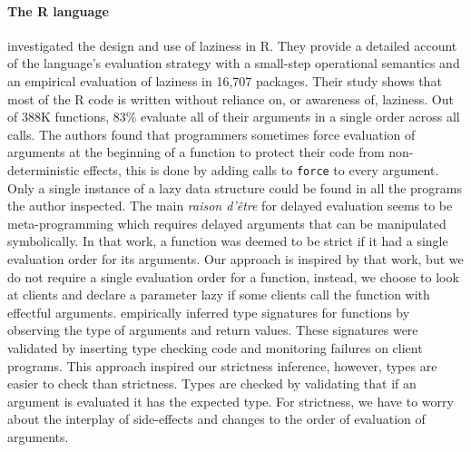 \documentclass[review,creen,acmsmall]{acmart}
\renewcommand{\c}[1]{\lstinline |#1|\xspace}
\begin{document}
\paragraph{The R language} \citet{oopsla19b} investigated the design and use of
laziness in R. They provide a detailed account of the language's evaluation
strategy with a small-step operational semantics and an empirical evaluation of
laziness in 16,707 packages. Their study shows that most of the R code is
written without reliance on, or awareness of, laziness. Out of 388K functions,
83\% evaluate all of their arguments in a single order across all calls. The
authors found that programmers sometimes force evaluation of arguments at the
beginning of a function to protect their code from non-deterministic effects,
this is done by adding calls to \c{force} to every argument. Only a single
instance of a lazy data structure could be found in all the programs the author
inspected. The main \emph{raison d'\^etre} for delayed evaluation seems to be
meta-programming which requires delayed arguments that can be manipulated
symbolically. In that work, a function was deemed to be strict if it had a
single evaluation order for its arguments. Our approach is inspired by that
work, but we do not require a single evaluation order for a function, instead,
we choose to look at clients and declare a parameter lazy if some clients call
the function with effectful arguments. \citet{oopsla20b} empirically inferred
{type} signatures for functions by observing the type of arguments and return
values. These signatures were validated by inserting type checking code and
monitoring failures on client programs. This approach inspired our strictness
inference, however, types are easier to check than strictness. Types are checked
by validating that if an argument is evaluated it has the expected type. For
strictness, we have to worry about the interplay of side-effects and changes to
the order of evaluation of arguments.
\end{document}
